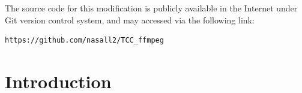 \documentclass[
	12pt,				%
	openright,			%
	twoside,			%
	a4paper,			%
	brazil,
	french,				%
	english
	]{abntex2}
\begin{document}
The source code for this modification is publicly available in the Internet under Git version control system, and may accessed via the following link:
\begin{verbatim}
https://github.com/nasall2/TCC_ffmpeg
\end{verbatim}
 
\chapter[Introduction]{Introduction}

\end{document}
